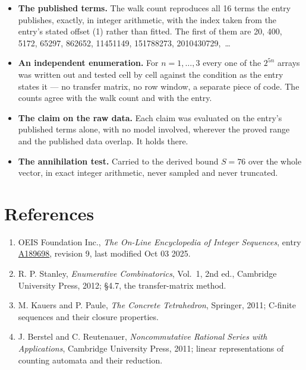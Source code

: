 \documentclass[11pt]{article}
\theoremstyle{definition}
\begin{document}
\begin{itemize}

\item {\bfseries The published terms.} The walk count reproduces all 16 terms the entry publishes, exactly, in integer arithmetic, with the index taken from the entry's stated offset (1) rather than fitted. The first of them are 20, 400, 5172, 65297, 862652, 11451149, 151788273, 2010430729,~\dots

\item {\bfseries An independent enumeration.} For $n = 1,\dots,3$ every one of the $2^{5n}$ arrays was written out and tested cell by cell against the condition as the entry states it --- no transfer matrix, no row window, a separate piece of code. The counts agree with the walk count and with the entry.

\item {\bfseries The claim on the raw data.} Each claim was evaluated on the entry's published terms alone, with no model involved, wherever the proved range and the published data overlap. It holds there.

\item {\bfseries The annihilation test.} Carried to the derived bound $S = 76$ over the whole vector, in exact integer arithmetic, never sampled and never truncated.

\end{itemize}

\section{References}

\begin{enumerate}

\item OEIS Foundation Inc., \emph{The On-Line Encyclopedia of Integer Sequences}, entry \href{https://oeis.org/A189698}{A189698}, revision 9, last modified Oct 03 2025.

\item R. P. Stanley, \emph{Enumerative Combinatorics}, Vol.~1, 2nd ed., Cambridge University Press, 2012; \S4.7, the transfer-matrix method.

\item M. Kauers and P. Paule, \emph{The Concrete Tetrahedron}, Springer, 2011; C-finite sequences and their closure properties.

\item J. Berstel and C. Reutenauer, \emph{Noncommutative Rational Series with Applications}, Cambridge University Press, 2011; linear representations of counting automata and their reduction.

\end{enumerate}
\end{document}
